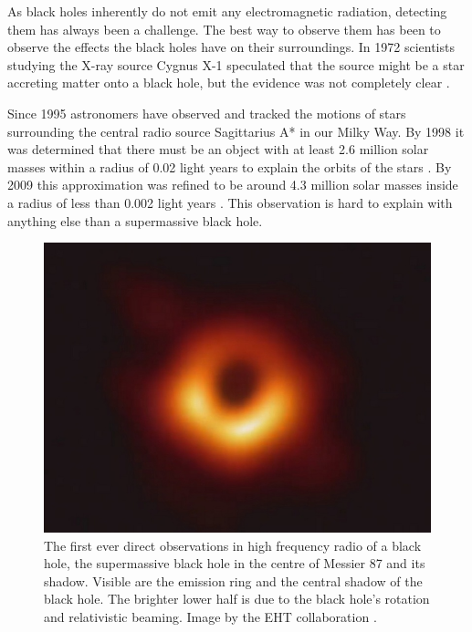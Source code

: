 \documentclass[english, oneside]{HYgradu}
\begin{document}
As black holes inherently do not emit any electromagnetic radiation, detecting them has always been a challenge. The best way to observe them has been to observe the effects the black holes have on their surroundings. In 1972 scientists studying the X-ray source Cygnus X-1 speculated that the source might be a star accreting matter onto a black hole, but the evidence was not completely clear \citep{bolton:1972, webster:1972}.

Since 1995 astronomers have observed and tracked the motions of stars surrounding the central radio source Sagittarius A* in our Milky Way. By 1998 it was determined that there must be an object with at least 2.6 million solar masses within a radius of 0.02 light years to explain the orbits of the stars \citep{ghez:1998}. By 2009 this approximation was refined to be around 4.3 million solar masses inside a radius of less than 0.002 light years \citep{gillessen:2009}. This observation is hard to explain with anything else than a supermassive black hole.

\begin{figure}[h!tb]
\centering
\includegraphics[width=\textwidth]{../images/blackhole.jpg}
\caption{The first ever direct observations in high frequency radio of a black hole, the supermassive black hole in the centre of Messier 87 and its shadow. Visible are the emission ring and the central shadow of the black hole. The brighter lower half is due to the black hole's rotation and relativistic beaming. Image by the EHT collaboration \citep{akiyama:2019}.}
\label{fig:BlackHole}
\end{figure}
\end{document}
